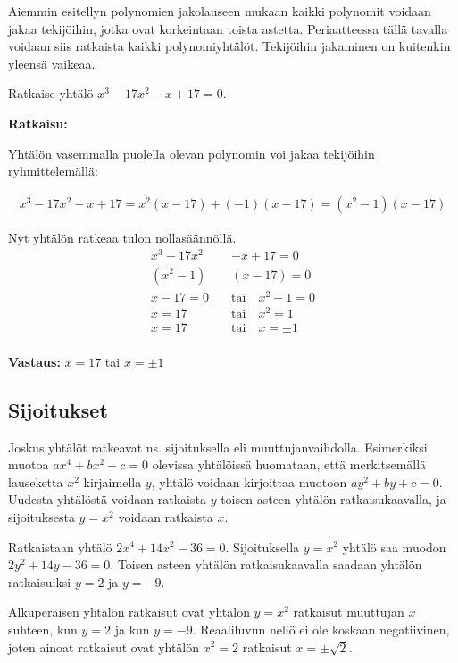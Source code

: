 Aiemmin esitellyn polynomien jakolauseen mukaan kaikki polynomit voidaan jakaa tekijöihin, jotka ovat korkeintaan toista astetta.
Periaatteessa tällä tavalla voidaan siis ratkaista kaikki polynomiyhtälöt. Tekijöihin jakaminen on kuitenkin yleensä vaikeaa.

\begin{esimerkki}
Ratkaise yhtälö $x^3-17x^2-x+17 = 0$.

\textbf{Ratkaisu:}

Yhtälön vasemmalla puolella olevan polynomin voi jakaa tekijöihin ryhmittelemällä:

\begin{align*}
x^3-17x^2-x+17=x^2(x-17)+(-1)(x-17)=(x^2-1)(x-17)
\end{align*}

Nyt yhtälön ratkeaa tulon nollasäännöllä.
\begin{align*}
x^3-17x^2&-x+17=0 \\
(x^2-1)&(x-17)=0 \\
x - 17 = 0 \quad &\text{tai} \quad x^2-1 = 0 \\
x = 17 \quad &\text{tai} \quad x^2 = 1 \\
x = 17 \quad &\text{tai} \quad x =\pm 1 \\
\end{align*}

\textbf{Vastaus:} $x = 17$ tai $x = \pm 1$
\end{esimerkki}

\subsection*{Sijoitukset}
Joskus yhtälöt ratkeavat ns. sijoituksella eli muuttujanvaihdolla. Esimerkiksi muotoa $ax^4+bx^2+c=0$ olevissa yhtälöissä huomataan, että merkitsemällä
lauseketta $x^2$ kirjaimella $y$, yhtälö voidaan kirjoittaa muotoon $ay^2+by+c=0$. Uudesta yhtälöstä voidaan ratkaista $y$ toisen asteen yhtälön
ratkaisukaavalla, ja sijoituksesta $y = x^2$ voidaan ratkaista $x$.

\begin{esimerkki}
Ratkaistaan yhtälö $2x^4+14x^2-36=0$. Sijoituksella $y = x^2$ yhtälö saa muodon $2y^2+14y-36 = 0$. Toisen asteen yhtälön ratkaisukaavalla saadaan yhtälön ratkaisuiksi $y = 2$ ja $y = -9$.

Alkuperäisen yhtälön ratkaisut ovat yhtälön $y = x^2$ ratkaisut muuttujan $x$ suhteen, kun $y = 2$ ja kun $y = -9$. Reaaliluvun neliö ei ole koskaan
negatiivinen, joten ainoat ratkaisut ovat yhtälön $x^2 = 2$ ratkaisut $x = \pm\sqrt{2}$.
\end{esimerkki}

